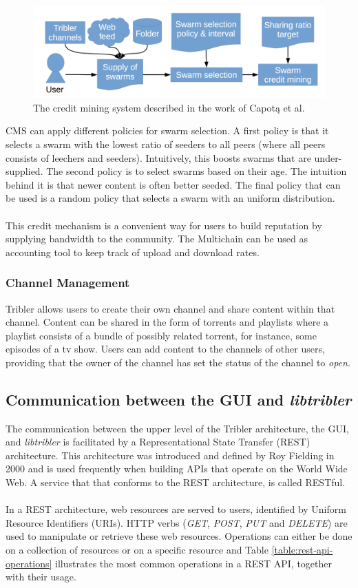 \begin{figure}[h!]
	\centering
	\includegraphics[width=0.7\columnwidth]{images/architecture/credit_mining}
	\caption{The credit mining system described in the work of Capot\k{a} et al.}
	\label{fig:credit-mining}
\end{figure}

CMS can apply different policies for swarm selection. A first policy is that it selects a swarm with the lowest ratio of seeders to all peers (where all peers consists of leechers and seeders). Intuitively, this boosts swarms that are under-supplied. The second policy is to select swarms based on their age. The intuition behind it is that newer content is often better seeded. The final policy that can be used is a random policy that selects a swarm with an uniform distribution.\\\\
This credit mechanism is a convenient way for users to build reputation by supplying bandwidth to the community. The Multichain can be used as accounting tool to keep track of upload and download rates.

\subsubsection{\textbf{Channel Management}}
Tribler allows users to create their own channel and share content within that channel. Content can be shared in the form of torrents and playlists where a playlist consists of a bundle of possibly related torrent, for instance, some episodes of a tv show. Users can add content to the channels of other users, providing that the owner of the channel has set the status of the channel to \emph{open}.

\subsection{Communication between the GUI and \emph{libtribler}}
The communication between the upper level of the Tribler architecture, the GUI, and \emph{libtribler} is facilitated by a Representational State Transfer (REST) architecture. This architecture was introduced and defined by Roy Fielding in 2000\cite{fielding2000fielding} and is used frequently when building APIs that operate on the World Wide Web. A service that that conforms to the REST architecture, is called RESTful.\\\\
In a REST architecture, web resources are served to users, identified by Uniform Resource Identifiers (URIs). HTTP verbs (\emph{GET}, \emph{POST}, \emph{PUT} and \emph{DELETE}) are used to manipulate or retrieve these web resources. Operations can either be done on a collection of resources or on a specific resource and Table \ref{table:rest-api-operations} illustrates the most common operations in a REST API, together with their usage.\\

